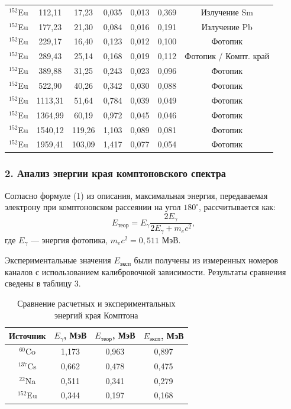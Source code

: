 \documentclass[12pt,a4paper]{article}
\begin{document}
\begin{table}[H]
{\begin{tabular}{|c|c|c|c|c|c|c|}
\hline
$^{152}$Eu  & 112,11 & 17,23 & 0,035 & 0,013 & 0,369 & Излучение Sm \\
$^{152}$Eu  & 177,23 & 21,30 & 0,084 & 0,016 & 0,191 & Излучение Pb \\
$^{152}$Eu  & 229,17 & 16,40 & 0,123 & 0,012 & 0,100 & Фотопик \\
$^{152}$Eu  & 289,43 & 25,14 & 0,168 & 0,019 & 0,112 & Фотопик / Компт. край \\
$^{152}$Eu  & 389,88 & 31,25 & 0,243 & 0,023 & 0,096 & Фотопик \\
$^{152}$Eu  & 522,90 & 40,26 & 0,342 & 0,030 & 0,088 & Фотопик \\
$^{152}$Eu  & 1113,31 & 51,64 & 0,784 & 0,039 & 0,049 & Фотопик \\
$^{152}$Eu  & 1364,99 & 60,19 & 0,972 & 0,045 & 0,046 & Фотопик \\
$^{152}$Eu  & 1540,12 & 119,26 & 1,103 & 0,089 & 0,081 & Фотопик \\
$^{152}$Eu  & 1959,41 & 103,09 & 1,417 & 0,077 & 0,054 & Фотопик \\
\hline
\end{tabular}%
}
\end{table}




\subsubsection*{2. Анализ энергии края комптоновского спектра}

Согласно формуле (1) из описания, максимальная энергия, передаваемая электрону при комптоновском рассеянии на угол $180^\circ$, рассчитывается как:
\begin{equation}
    E_{\text{теор}} = E_\gamma \frac{2E_\gamma}{2E_\gamma + m_e c^2},
\end{equation}
где $E_\gamma$ --- энергия фотопика, $m_e c^2 = 0,511$ МэВ.

Экспериментальные значения $E_{\text{эксп}}$ были получены из измеренных номеров каналов с использованием калибровочной зависимости. Результаты сравнения сведены в таблицу 3.

\begin{table}[H]
\centering
\caption{Сравнение расчетных и экспериментальных энергий края Комптона}
\label{tab:compton_edge}
\renewcommand{\arraystretch}{1.2}
\begin{tabular}{|c|c|c|c|}
\hline
Источник & $E_\gamma$, МэВ & $E_{\text{теор}}$, МэВ & $E_{\text{эксп}}$, МэВ \\
\hline
$^{60}$Co  & 1,173 & 0,963 & 0,897 \\
$^{137}$Cs & 0,662 & 0,478 & 0,475 \\
$^{22}$Na  & 0,511 & 0,341 & 0,279 \\
$^{152}$Eu & 0,344 & 0,197 & 0,168 \\
\hline
\end{tabular}
\end{table}
\end{document}
